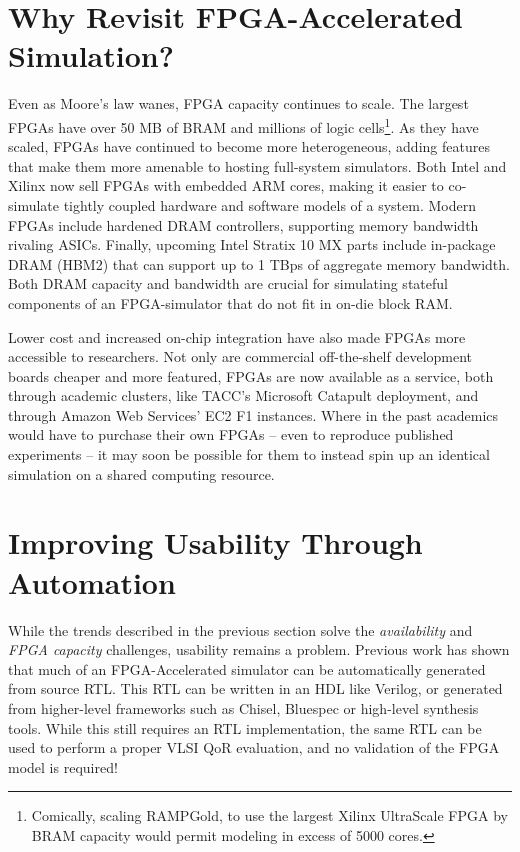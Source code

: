 \section{Why Revisit FPGA-Accelerated Simulation?}

Even as Moore's law wanes, FPGA capacity continues to scale. The largest FPGAs
have over 50 MB of BRAM and millions of logic cells\footnote{Comically, scaling
RAMPGold\cite{rampgold}, to use the largest Xilinx UltraScale
FPGA\cite{ultrascale} by BRAM capacity would permit modeling in excess of 5000
cores.}. As they have scaled, FPGAs have continued to become more
heterogeneous, adding features that make them more amenable to hosting
full-system simulators.  Both Intel and Xilinx now sell FPGAs with embedded ARM
cores, making it easier to co-simulate tightly coupled hardware and software
models of a system. Modern FPGAs include hardened DRAM controllers, supporting
memory bandwidth rivaling ASICs. Finally, upcoming Intel Stratix 10 MX parts
include in-package DRAM (HBM2) that can support up to 1 TBps of aggregate
memory bandwidth\cite{stratix10mx}. Both DRAM capacity and bandwidth are
crucial for simulating stateful components of an FPGA-simulator that do not fit
in on-die block RAM.

Lower cost and increased on-chip integration have also made FPGAs more
accessible to researchers.  Not only are commercial off-the-shelf development
boards cheaper and more featured, FPGAs are now available as a service, both
through academic clusters, like TACC's Microsoft
Catapult\cite{catapultannounce} deployment, and through Amazon Web Services'
EC2 F1 instances\cite{amazonf1}. Where in the past academics would have to
purchase their own FPGAs -- even to reproduce published experiments -- it may
soon be possible for them to instead spin up an identical simulation on a
shared computing resource.

\section{Improving Usability Through Automation}

While the trends described in the previous section solve the
\emph{availability} and \emph{FPGA capacity} challenges, usability remains a
problem. Previous work\cite{fabscalarfpga, strober} has shown that much of an
FPGA-Accelerated simulator can be automatically generated from source RTL. This
RTL can be written in an HDL like Verilog, or generated from higher-level
frameworks such as Chisel, Bluespec or high-level synthesis tools. While this
still requires an RTL implementation, the same RTL can be used to perform a
proper VLSI QoR evaluation, and no validation of the FPGA model is required!

